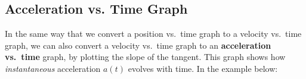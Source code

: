 \subsection{Acceleration vs. Time Graph}
In the same way that we convert a position vs.\ time graph to a velocity vs.\
time graph, we can also convert a velocity vs.\ time graph to an
\textbf{acceleration vs.\ time} graph, by plotting the slope of the tangent.
This graph shows how \emph{instantaneous} acceleration $a(t)$ evolves with
time. In the example below:
%    


